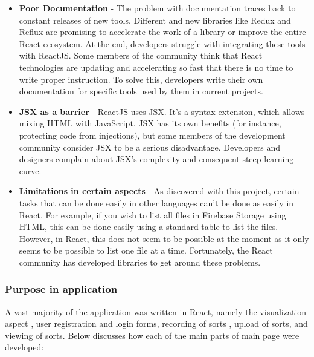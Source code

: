 \begin{itemize}
    \item \textbf{Poor Documentation} - The problem with documentation traces back to constant releases of new tools. Different and new libraries like Redux and Reflux are promising to accelerate the work of a library or improve the entire React ecosystem. At the end, developers struggle with integrating these tools with ReactJS. Some members of the community think that React technologies are updating and accelerating so fast that there is no time to write proper instruction. To solve this, developers write their own documentation for specific tools used by them in current projects.
    \item \textbf{JSX as a barrier} - ReactJS uses JSX. It’s a syntax extension, which allows mixing HTML with JavaScript. JSX has its own benefits (for instance, protecting code from injections), but some members of the development community consider JSX to be a serious disadvantage. Developers and designers complain about JSX’s complexity and consequent steep learning curve.
    \item \textbf{Limitations in certain aspects} - As discovered with this project, certain tasks that can be done easily in other languages can't be done as easily in React. For example, if you wish to list all files in Firebase Storage using HTML, this can be done easily using a standard table to list the files. However, in React, this does not seem to be possible at the moment as it only seems to be possible to list one file at a time. Fortunately, the React community has developed libraries to get around these problems.
\end{itemize}

\newpage
\subsubsection{Purpose in application}
A vast majority of the application was written in React, namely the visualization aspect \cite{sorting_howto}, user registration and login forms, recording of sorts \cite{screenflow}, upload of sorts, and viewing of sorts. Below discusses how each of the main parts of main page were developed:
\par
\bigskip
